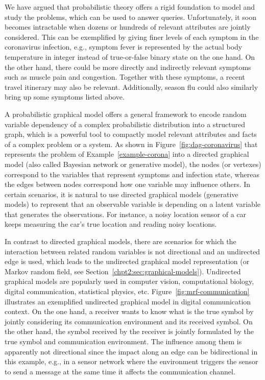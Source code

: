 We have argued that probabilistic theory offers a rigid foundation to model and study the problems, which can be used to answer queries. Unfortunately, it soon becomes intractable when dozens or hundreds of relevant attributes are jointly considered. This can be exemplified by giving finer levels of each symptom in the coronavirus infection, e.g., symptom fever is represented by the actual body temperature in integer instead of true-or-false binary state on the one hand. On the other hand, there could be more directly and indirectly relevant symptoms such as muscle pain and congestion. Together with these symptoms, a recent travel itinerary may also be relevant. Additionally, season flu could also similarly bring up some symptoms listed above. 

A probabilistic graphical model offers a general framework to encode random variable dependency of a complex probabilistic distribution into a structured graph, which is a powerful tool to compactly model relevant attributes and facts of a complex problem or a system. As shown in Figure~\ref{fig:dag-coronavirus} that represents the problem of Example~\ref{example-corona} into a directed graphical model (also called Bayesian network or generative model), the nodes (or vertexes) correspond to the variables that represent symptoms and infection state, whereas the edges between nodes correspond how one variable may influence others. In certain scenarios, it is natural to use directed graphical models (generative models) to represent that an observable variable is depending on a latent variable that generates the observations. For instance, a noisy location sensor of a car keeps measuring the car's true location and reading noisy locations. 

In contrast to directed graphical models, there are scenarios for which the interaction between related random variables is not directional and an undirected edge is used, which leads to the undirected graphical model representation (or Markov random field, see Section~\ref{chpt2:sec:graphical-models}). Undirected graphical models are popularly used in computer vision, computational biology, digital communication, statistical physics, etc. Figure~\ref{fig:mrf-communication} illustrates an exemplified undirected graphical model in digital communication context. On the one hand, a receiver wants to know what is the true symbol by jointly considering its communication environment and its received symbol. On the other hand, the symbol received by the receiver is jointly formulated by the true symbol and communication environment. The influence among them is apparently not directional since the impact along an edge can be bidirectional in this example, e.g., in a sensor network where the environment triggers the sensor to send a message at the same time it affects the communication channel.


